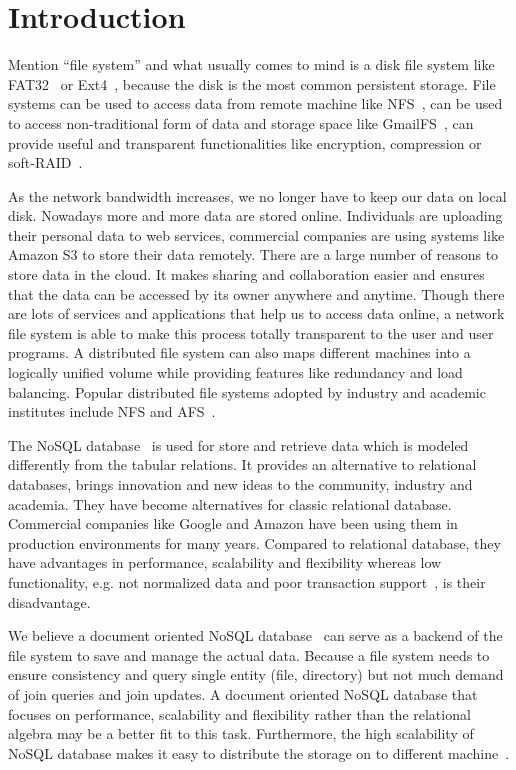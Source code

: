\chapter{Introduction}
\label{chap:intro}

    Mention ``file system'' and what usually comes to mind is a disk file system like FAT32~\cite{fat_wiki} or Ext4~\cite{ext4}, because the disk is the most common persistent storage. File systems can be used to access data from remote machine like NFS~\cite{nfs}, can be used to access non-traditional form of data and storage space like GmailFS~\cite{gmailfs, gmailfs2}, can provide useful and transparent functionalities like encryption, compression or soft-RAID~\cite{encrypt, compression}.

    As the network bandwidth increases, we no longer have to keep our data on local disk. Nowadays more and more data are stored online. Individuals are uploading their personal data to web services, commercial companies are using systems like Amazon S3 to store their data remotely. There are a large number of reasons to store data in the cloud. It makes sharing and collaboration easier and ensures that the data can be accessed by its owner anywhere and anytime. Though there are lots of services and applications that help us to access data online, a network file system is able to make this process totally transparent to the user and user programs. A distributed file system can also maps different machines into a logically unified volume while providing features like redundancy and load balancing. Popular distributed file systems adopted by industry and academic institutes include NFS and AFS~\cite{afs}.

    The NoSQL database~\cite{nosql} is used for store and retrieve data which is modeled differently from the tabular relations. It provides an alternative to relational databases,  brings innovation and new ideas to the community, industry and academia. They have become alternatives for classic relational database. Commercial companies like Google and Amazon have been using them in production environments for many years. Compared to relational database, they have advantages in performance, scalability and flexibility whereas low functionality, e.g. not normalized data and poor transaction support~\cite{transaction}, is their disadvantage.

    We believe a document oriented NoSQL database~\cite{docdb} can serve as a backend of the file system to save and manage the actual data. Because a file system needs to ensure consistency and query single entity (file, directory) but not much demand of join queries and join updates. A document oriented NoSQL database that focuses on performance, scalability and flexibility rather than the relational algebra may be a better fit to this task. Furthermore, the high scalability of NoSQL database makes it easy to distribute the storage on to different machine~\cite{sharding}.


